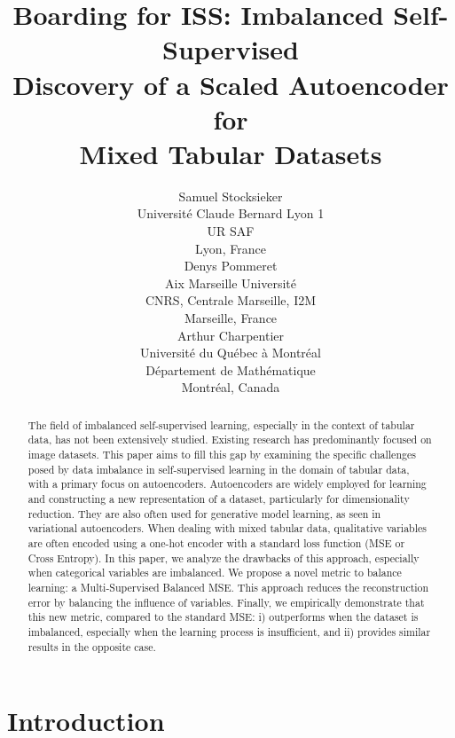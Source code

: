 \documentclass{article}
\title{Boarding for ISS: Imbalanced Self-Supervised \\Discovery of a Scaled Autoencoder for \\ Mixed Tabular Datasets}
\author{
  Samuel Stocksieker \\
  Université Claude Bernard Lyon 1 \\
  UR SAF\\ 
  Lyon, 
  France \\
   \And
  Denys Pommeret \\
  Aix Marseille Université\\
  CNRS, Centrale Marseille, I2M\\ 
  Marseille, 
  France \\
   \And
  Arthur Charpentier \\
  Université du Québec à Montréal\\
  Département de Mathématique\\
  Montréal, 
  Canada
}
\theoremstyle{definition}
\begin{document}
\maketitle



\begin{abstract}
The field of imbalanced self-supervised learning, especially in the context of tabular data, has not been extensively studied. Existing research has predominantly focused on image datasets. This paper aims to fill this gap by examining the specific challenges posed by data imbalance in self-supervised learning in the domain of tabular data, with a primary focus on autoencoders. Autoencoders are widely employed for learning and constructing a new representation of a dataset, particularly for dimensionality reduction. They are also often used for generative model learning, as seen in variational autoencoders. When dealing with mixed tabular data, qualitative variables are often encoded using a one-hot encoder with a standard loss function (MSE or Cross Entropy). In this paper, we analyze the drawbacks of this approach, especially when categorical variables are imbalanced. We propose a novel metric to balance learning: a Multi-Supervised Balanced MSE. This approach reduces the reconstruction error by balancing the influence of variables. Finally, we empirically demonstrate that this new metric, compared to the standard MSE: i) outperforms when the dataset is imbalanced, especially when the learning process is insufficient, and ii) provides similar results in the opposite case.
\end{abstract}


\section{Introduction}
\end{document}
